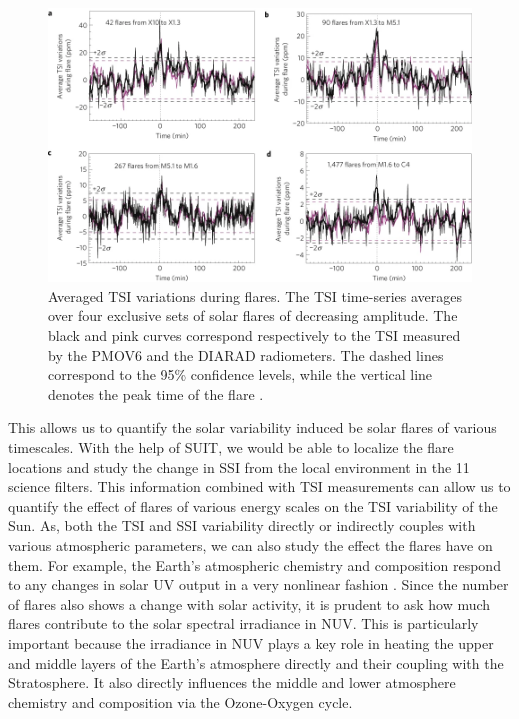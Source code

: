 \begin{figure}[ht!]
    \centering
    \includegraphics[width = 0.7\linewidth]{Figures/nphys1741_page-0002.png}
    \caption[Averaged TSI variations during flares of various strengths.]{Averaged TSI variations during flares. The TSI time-series averages over four exclusive sets of solar flares of decreasing amplitude. The black and pink curves correspond respectively to the TSI measured by the PMOV6 and the DIARAD radiometers. The dashed lines correspond to the 95\% confidence levels, while the vertical line denotes the peak time of the flare \citep{kretzschmar10}.}
    \label{fig2}
\end{figure}

This allows us to quantify the solar variability induced be solar flares of various timescales. With the help of SUIT, we would be able to localize the flare locations and study the change in SSI from the local environment in the 11 science filters. This information combined with TSI measurements can allow us to quantify the effect of flares of various energy scales on the TSI variability of the Sun. As, both the TSI and SSI variability directly or indirectly couples with various atmospheric parameters, we can also study the effect the flares have on them. For example, the Earth's atmospheric chemistry and composition respond to any changes in solar UV output in a very nonlinear fashion \citep{haigh07}. Since the number of flares also shows a change with solar activity, it is prudent to ask how much flares contribute to the solar spectral irradiance in NUV. This is particularly important because the irradiance in NUV plays a key role in heating the upper and middle layers of the Earth's atmosphere directly and their coupling with the Stratosphere. It also directly influences the middle and lower atmosphere chemistry and composition via the Ozone-Oxygen cycle.


